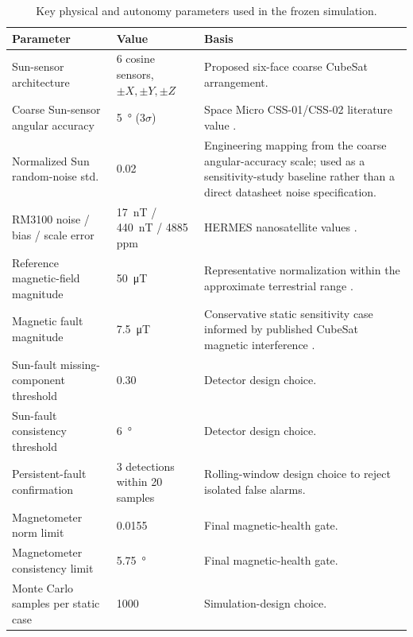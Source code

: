 \documentclass[11pt,a4paper]{article}
\begin{document}
\begin{table}[H]
\centering
\caption{Key physical and autonomy parameters used in the frozen simulation.}
\label{tab:sensor-parameters}
\scriptsize
\renewcommand{\arraystretch}{1.18}
\setlength{\tabcolsep}{4pt}
\begin{tabularx}{\textwidth}{|p{3.2cm}|p{3.0cm}|X|}
\hline
\textbf{Parameter} & \textbf{Value} & \textbf{Basis} \\
\hline
Sun-sensor architecture & 6 cosine sensors, $\pm X,\pm Y,\pm Z$ & Proposed six-face coarse CubeSat arrangement. \\
\hline
Coarse Sun-sensor angular accuracy & \SI{5}{\degree} (3$\sigma$) & Space Micro CSS-01/CSS-02 literature value \cite{nasa2024soa}. \\
\hline
Normalized Sun random-noise std. & 0.02 & Engineering mapping from the coarse angular-accuracy scale; used as a sensitivity-study baseline rather than a direct datasheet noise specification. \\
\hline
RM3100 noise / bias / scale error & \SI{17}{\nano\tesla} / \SI{440}{\nano\tesla} / 4885 ppm & HERMES nanosatellite values \cite{colagrossi2023hermes}. \\
\hline
Reference magnetic-field magnitude & \SI{50}{\micro\tesla} & Representative normalization within the approximate terrestrial range \cite{noaaGeomagFAQ}. \\
\hline
Magnetic fault magnitude & \SI{7.5}{\micro\tesla} & Conservative static sensitivity case informed by published CubeSat magnetic interference \cite{miles2016fluxgate,hoffmann2022spacecraftnoise}. \\
\hline
Sun-fault missing-component threshold & 0.30 & Detector design choice. \\
\hline
Sun-fault consistency threshold & \SI{6}{\degree} & Detector design choice. \\
\hline
Persistent-fault confirmation & 3 detections within 20 samples & Rolling-window design choice to reject isolated false alarms. \\
\hline
Magnetometer norm limit & 0.0155 & Final magnetic-health gate. \\
\hline
Magnetometer consistency limit & \SI{5.75}{\degree} & Final magnetic-health gate. \\
\hline
Monte Carlo samples per static case & 1000 & Simulation-design choice. \\
\hline
\end{tabularx}
\end{table}
\end{document}
